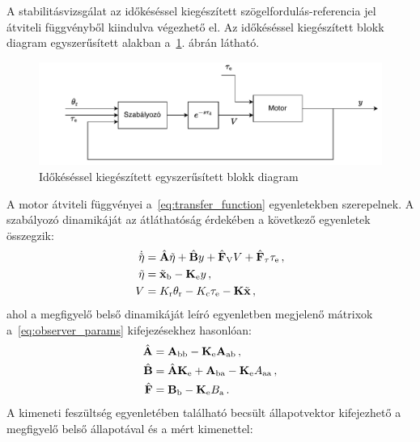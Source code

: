 A stabilitásvizsgálat az időkéséssel kiegészített szögelfordulás-referencia jel átviteli függvényből 
kiindulva végezhető el. Az időkéséssel kiegészített blokk diagram egyszerűsített alakban 
a~\ref{fig:block_diagram_time_delay}. ábrán látható.
\begin{figure}[ht]
    \begin{center}
    \includegraphics[width=\textwidth]{images/block_diagram_time_delay.pdf}
    \caption{Időkéséssel kiegészített egyszerűsített blokk diagram}\label{fig:block_diagram_time_delay}
    \end{center}
\end{figure}
A motor átviteli függvényei a~\eqref{eq:transfer_function} egyenletekben szerepelnek. A szabályozó dinamikáját 
az átláthatóság érdekében a következő egyenletek összegzik:
\begin{equation}
    \begin{split}
        \dot{\tilde{\mathbf{\eta}}} &= \hat{\mathbf{A}} \tilde{\mathbf{\eta}} + \hat{\mathbf{B}} y + \hat{\mathbf{F}}_{\mathrm{V}} V + \hat{\mathbf{F}}_{\mathrm{\tau}} \tau_{\mathrm{e}}\,, \\
        \tilde{\mathbf{\eta}} &= \tilde{\mathbf{x}}_{\mathrm{b}} - \mathbf{K}_{\mathrm{e}} y\,, \\
        V &= K_{\mathrm{r}} \theta_{\mathrm{r}} - K_{\mathrm{c}} \tau_{\mathrm{e}} - \mathbf{K} \tilde{\mathbf{x}}\,,
    \end{split}
\end{equation}
ahol a megfigyelő belső dinamikáját leíró egyenletben megjelenő mátrixok a~\eqref{eq:observer_params} kifejezésekhez hasonlóan:
\begin{align}
    \begin{split}
        \hat{\mathbf{A}} &= \mathbf{A}_{\mathrm{bb}} - \mathbf{K}_{\mathrm{e}} \mathbf{A}_{\mathrm{ab}}\,,\\
        \hat{\mathbf{B}} &= \hat{\mathbf{A}} \mathbf{K}_{\mathrm{e}} + \mathbf{A}_{\mathrm{ba}} - \mathbf{K}_{\mathrm{e}} A_{\mathrm{aa}}\,,\\
        \hat{\mathbf{F}} &= \mathbf{B}_{\mathrm{b}} - \mathbf{K}_{\mathrm{e}} B_{\mathrm{a}}\,.
    \end{split}
\end{align}
A kimeneti feszültség egyenletében található becsült állapotvektor kifejezhető a megfigyelő belső állapotával és a mért kimenettel:

